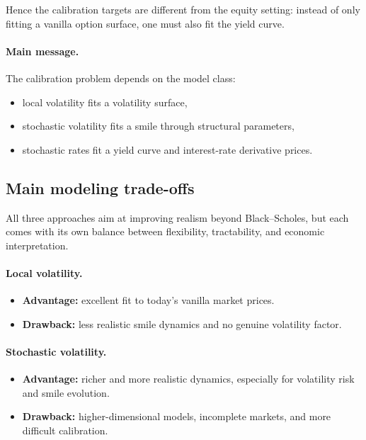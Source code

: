 \documentclass[11pt]{article}
\theoremstyle{plain}
\theoremstyle{definition}
\theoremstyle{remark}
\begin{document}
Hence the calibration targets are different from the equity setting:
instead of only fitting a vanilla option surface, one must also fit the
yield curve.

\paragraph{Main message.}
The calibration problem depends on the model class:
\begin{itemize}[leftmargin=1.4em]
    \item local volatility fits a volatility surface,
    \item stochastic volatility fits a smile through structural
    parameters,
    \item stochastic rates fit a yield curve and interest-rate
    derivative prices.
\end{itemize}

\subsection{Main modeling trade-offs}

All three approaches aim at improving realism beyond Black--Scholes, but
each comes with its own balance between flexibility, tractability, and
economic interpretation.

\paragraph{Local volatility.}
\begin{itemize}[leftmargin=1.4em]
    \item \textbf{Advantage:} excellent fit to today's vanilla market
    prices.
    \item \textbf{Drawback:} less realistic smile dynamics and no genuine
    volatility factor.
\end{itemize}

\paragraph{Stochastic volatility.}
\begin{itemize}[leftmargin=1.4em]
    \item \textbf{Advantage:} richer and more realistic dynamics,
    especially for volatility risk and smile evolution.
    \item \textbf{Drawback:} higher-dimensional models, incomplete
    markets, and more difficult calibration.
\end{itemize}
\end{document}
